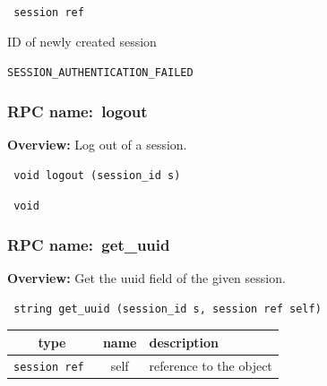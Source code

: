 \vspace{0.3cm}

{\tt 
session ref
}


ID of newly created session

\vspace{0.3cm}

 {\tt SESSION\_AUTHENTICATION\_FAILED}

\vspace{0.3cm}
\vspace{0.3cm}
\vspace{0.3cm}
\subsubsection{RPC name:~logout}

{\bf Overview:} 
Log out of a session.

\begin{verbatim} void logout (session_id s)\end{verbatim}


\vspace{0.3cm}

{\tt 
void
}



\vspace{0.3cm}
\vspace{0.3cm}
\vspace{0.3cm}
\subsubsection{RPC name:~get\_uuid}

{\bf Overview:} 
Get the uuid field of the given session.

\begin{verbatim} string get_uuid (session_id s, session ref self)\end{verbatim}



 
\vspace{0.3cm}
\begin{tabular}{|c|c|p{7cm}|}
 \hline
{\bf type} & {\bf name} & {\bf description} \\ \hline
{\tt session ref } & self & reference to the object \\ \hline 

\end{tabular}

